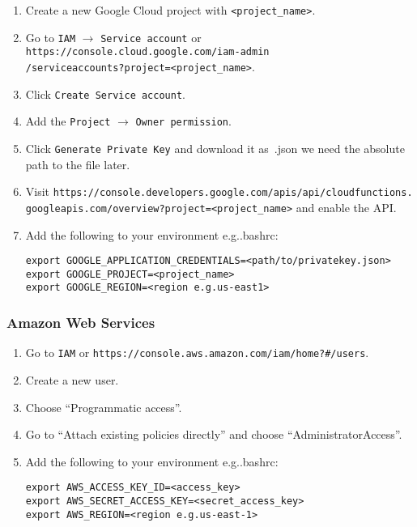 \documentclass[../main.tex]{subfiles}
\begin{document}
\begin{enumerate}
\item Create a new Google Cloud project with \texttt{<project\_name>}.
\item Go to \texttt{IAM} $\rightarrow$ \texttt{Service account} or \texttt{https://console.cloud.google.com/iam-admin\\
  /serviceaccounts?project=<project\_name>}.
\item Click \texttt{Create Service account}.
\item Add the \texttt{Project} $\rightarrow$ \texttt{Owner permission}. %
\item Click \texttt{Generate Private Key} and download it as~.json we need the absolute path to the file later.
\item Visit \texttt{https://console.developers.google.com/apis/api/cloudfunctions.\\
  googleapis.com/overview?project=<project\_name>} and enable the API.\@
\item Add the following to your environment e.g.\@ .bashrc: 
  \begin{tcolorbox}
    \texttt{export GOOGLE\_APPLICATION\_CREDENTIALS=<path/to/privatekey.json>}\\
    \texttt{export GOOGLE\_PROJECT=<project\_name>}\\
    \texttt{export GOOGLE\_REGION=<region e.g.\@ us-east1>}
  \end{tcolorbox}
\end{enumerate}

\subsubsection{Amazon Web Services}\label{sec:providersetupaws}
\begin{enumerate}
\item Go to \texttt{IAM} or \texttt{https://console.aws.amazon.com/iam/home?\#/users}.
\item Create a new user.
\item Choose ``Programmatic access''.
\item Go to ``Attach existing policies directly'' and choose ``AdministratorAccess''.
\item Add the following to your environment e.g.\@ .bashrc: 
  \begin{tcolorbox}
    \texttt{export AWS\_ACCESS\_KEY\_ID=<access\_key>}\\
    \texttt{export AWS\_SECRET\_ACCESS\_KEY=<secret\_access\_key>}\\
    \texttt{export AWS\_REGION=<region e.g.\@ us-east-1>}
  \end{tcolorbox}
\end{enumerate}
\end{document}
